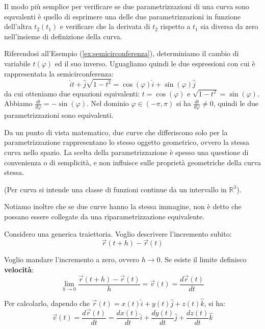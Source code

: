 Il modo più semplice per verificare se due parametrizzazioni di una curva sono equvalenti è quello di esprimere una delle due parametrizzazioni in funzione dell'altra $t_2(t_1)$ e verificare che la derivata di $t_2$ rispetto a $t_1$ sia diversa da zero nell'insieme di definizione della curva.

\begin{example}
    Riferendosi all'Esempio (\ref{ex:semicirconferenza}), determiniamo il cambio di variabile $t(\varphi)$ ed il suo inverso. Uguagliamo quindi le due espressioni con cui è rappresentata la semicirconferenza:
    \begin{equation*}
        \hat i t + \hat j \sqrt{1 - t^2} = \cos(\varphi)\hat i + \sin(\varphi)\hat j
    \end{equation*}
    da cui otteniamo due equazioni equivalenti: $t=\cos(\varphi)$ e $\sqrt{1 - t^2} = \sin(\varphi)$.
    Abbiamo $\frac{dt}{d\varphi} = -\sin(\varphi)$. Nel dominio $\varphi \in (-\pi , \pi )$ si ha $\frac{dt}{d\varphi} \neq 0$, quindi le due parametrizzazioni sono equivalenti.
\end{example}

\begin{inciso}
    Da un punto di vista matematico, due curve che differiscono solo per la parametrizzazione rappresentano lo stesso oggetto geometrico, ovvero la stessa curva nello spazio. La scelta della parametrizzazione è spesso una questione di convenienza o di semplicità, e non influisce sulle proprietà geometriche della curva stessa.

    (Per curva si intende una classe di funzioni continue da un intervallo in $\mathbb{R}^3$).

    Notiamo inoltre che se due curve hanno la stessa immagine, non è detto che possano essere collegate da una riparametrizzazione equivalente. 
\end{inciso}

\begin{definition}
    Considero una generica traiettoria. Voglio descrivere l'incremento subito:
    \begin{equation*}
        \vec r(t+h)- \vec r(t)
    \end{equation*}

    Voglio mandare l'incremento a zero, ovvero $h \to 0$. Se esiste il limite definisco \textbf{velocità}:
    \begin{equation*}
        \lim_{h \to 0} \frac{\vec r(t+h)-\vec r(t)}{h} = \vec v(t) = \frac{d \vec r(t)}{dt}
    \end{equation*}

    Per calcolarlo, dapendo che $\vec r(t) = x(t)\hat i + y(t)\hat j + z(t)\hat k$, si ha:
    \begin{equation*}
        \vec v(t) = \frac{d \vec r(t)}{dt} = \frac{dx(t)}{dt}\hat i + \frac{dy(t)}{dt}\hat j + \frac{dz(t)}{dt}\hat k
    \end{equation*}
\end{definition}

